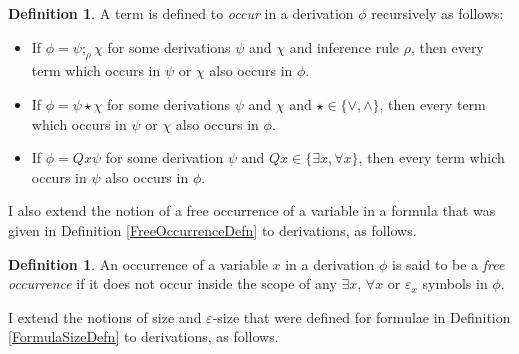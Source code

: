 \documentclass[10pt]{article}
\theoremstyle{definition}\newtheorem{remark}[theorem]{Remark}
\theoremstyle{definition}\newtheorem{example}[theorem]{Example}
\theoremstyle{definition}\newtheorem{definition}[theorem]{Definition}
\newcommand{\compByInf}[1]{;_{#1}}
\begin{document}
	\begin{definition}
		A term is defined to \textit{occur} in a derivation $\phi$ recursively as follows:
		
		\begin{itemize}
			\item If $\phi = \psi \compByInf{\rho} \chi$ for some derivations $\psi$ and $\chi$ and inference rule $\rho$, then every term which occurs in $\psi$ or $\chi$ also occurs in $\phi$.
			
			\item If $\phi = \psi \star \chi$ for some derivations $\psi$ and $\chi$ and $\star \in \{\lor, \land\}$, then every term which occurs in $\psi$ or $\chi$ also occurs in $\phi$.
			
			\item If $\phi = Qx \psi$ for some derivation $\psi$ and $Qx \in \{\exists x, \forall x\}$, then every term which occurs in $\psi$ also occurs in $\phi$.
		\end{itemize}
	\end{definition}

	I also extend the notion of a free occurrence of a variable in a formula that was given in Definition \ref{FreeOccurrenceDefn} to derivations, as follows.

	\begin{definition}
		An occurrence of a variable $x$ in a derivation $\phi$ is said to be a \textit{free occurrence} if it does not occur inside the scope of any $\exists x$, $\forall x$ or $\varepsilon_x$ symbols in $\phi$.
	\end{definition}

	I extend the notions of size and $\varepsilon$-size that were defined for formulae in Definition \ref{FormulaSizeDefn} to derivations, as follows.
\end{document}
